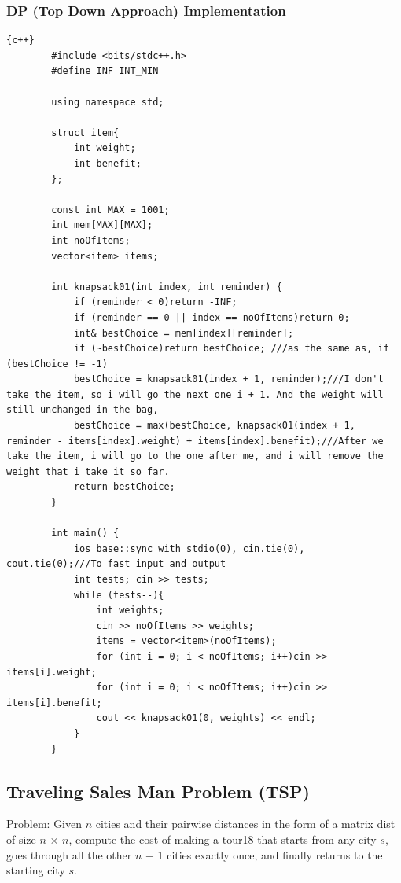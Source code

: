 \subsubsection{DP (Top Down Approach) Implementation}
\begin{lstlisting}{c++}
        #include <bits/stdc++.h>
        #define INF INT_MIN
        
        using namespace std;
        
        struct item{
        	int weight;
        	int benefit;
        };
        
        const int MAX = 1001;
        int mem[MAX][MAX];
        int noOfItems;
        vector<item> items;
        
        int knapsack01(int index, int reminder) {
        	if (reminder < 0)return -INF;
            if (reminder == 0 || index == noOfItems)return 0;
        	int& bestChoice = mem[index][reminder];
        	if (~bestChoice)return bestChoice; ///as the same as, if (bestChoice != -1)
        	bestChoice = knapsack01(index + 1, reminder);///I don't take the item, so i will go the next one i + 1. And the weight will still unchanged in the bag,
        	bestChoice = max(bestChoice, knapsack01(index + 1, reminder - items[index].weight) + items[index].benefit);///After we take the item, i will go to the one after me, and i will remove the weight that i take it so far.
        	return bestChoice;
        }
        
        int main() {
        	ios_base::sync_with_stdio(0), cin.tie(0), cout.tie(0);///To fast input and output
        	int tests; cin >> tests;
        	while (tests--){
                int weights;
                cin >> noOfItems >> weights;
                items = vector<item>(noOfItems);
                for (int i = 0; i < noOfItems; i++)cin >> items[i].weight;
                for (int i = 0; i < noOfItems; i++)cin >> items[i].benefit;
                cout << knapsack01(0, weights) << endl;
            }
        }
\end{lstlisting}

\newpage

\subsection{Traveling Sales Man Problem (TSP)}
Problem: Given $n$ cities and their pairwise distances in the form of a matrix dist of size $n$ × $n$, compute the cost of making a tour18 that starts from any city $s$, goes through all the other $n$ − 1 cities exactly once, and finally returns to the starting city $s$.

